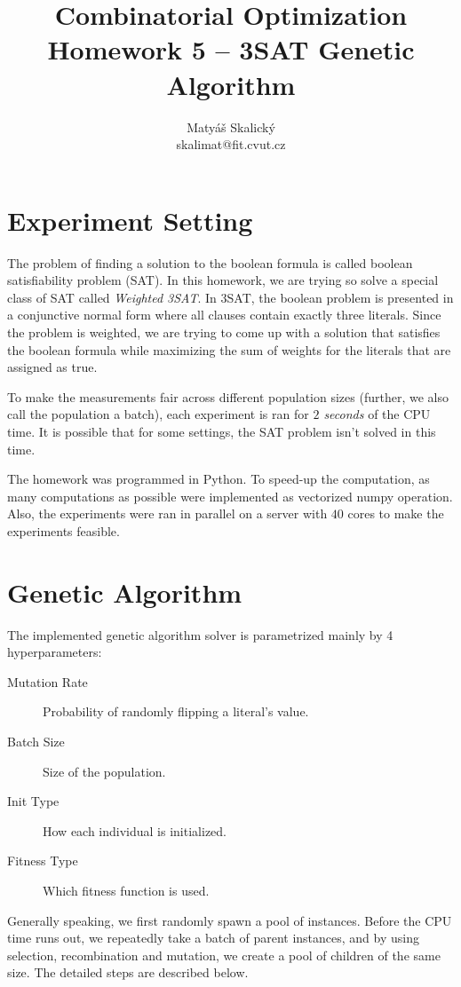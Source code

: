 \documentclass[a4paper,10pt]{article}
\title{Combinatorial Optimization\\Homework 5 – 3SAT Genetic Algorithm}
\author{Matyáš Skalický\\skalimat@fit.cvut.cz}
\begin{document}
\maketitle
\tableofcontents
\medskip

\section{Experiment Setting}
The problem of finding a solution to the boolean formula is called boolean satisfiability problem (SAT). In this homework, we are trying so solve a special class of SAT called \emph{Weighted 3SAT}. In 3SAT, the boolean problem is presented in a conjunctive normal form where all clauses contain exactly three literals. Since the problem is weighted, we are trying to come up with a solution that satisfies the boolean formula while maximizing the sum of weights for the literals that are assigned as true.

To make the measurements fair across different population sizes (further, we also call the population a batch), each experiment is ran for \emph{$2$ seconds} of the CPU time. It is possible that for some settings, the SAT problem isn't solved in this time.

The homework was programmed in Python. To speed-up the computation, as many computations as possible were implemented as vectorized numpy operation. Also, the experiments were ran in parallel on a server with $40$ cores to make the experiments feasible.

\section{Genetic Algorithm}

The implemented genetic algorithm solver is parametrized mainly by 4 hyperparameters:

\begin{description}
	\item[Mutation Rate]{Probability of randomly flipping a literal's value.}
	\item[Batch Size]{Size of the population.}
	\item[Init Type]{How each individual is initialized.}
	\item[Fitness Type]{Which fitness function is used.}
\end{description}

Generally speaking, we first randomly spawn a pool of instances. Before the CPU time runs out, we repeatedly take a batch of parent instances, and by using selection, recombination and mutation, we create a pool of children of the same size. The detailed steps are described below.
\end{document}
